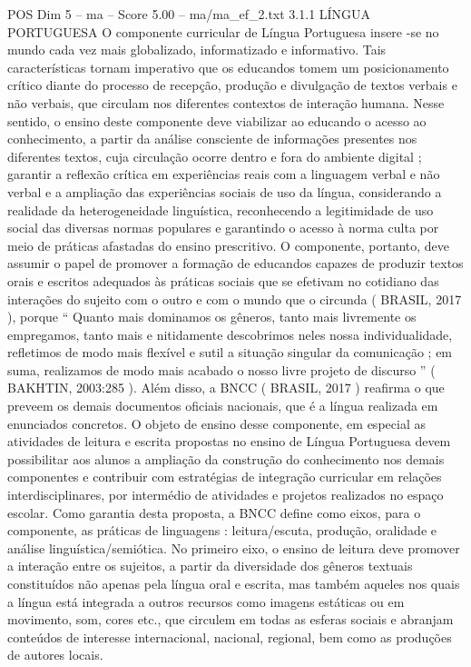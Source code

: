 \begin{textsample}{POS Dim 5 – ma – Score 5.00 – ma/ma\_ef\_2.txt}  \label{ex:f5_pos_173}
3.1.1 LÍNGUA PORTUGUESA O componente curricular de Língua Portuguesa insere -se no mundo cada vez mais globalizado, informatizado e informativo.
Tais características tornam imperativo que os educandos tomem um posicionamento crítico diante do processo de recepção, produção e divulgação de textos verbais e não verbais, que circulam nos diferentes contextos de interação humana.
Nesse sentido, o ensino deste componente deve viabilizar ao educando o acesso ao conhecimento, a partir da análise consciente de informações presentes nos diferentes textos, cuja circulação ocorre dentro e fora do ambiente digital ; garantir a reflexão crítica em experiências reais com a linguagem verbal e não verbal e a ampliação das experiências sociais de uso da língua, considerando a realidade da heterogeneidade linguística, reconhecendo a legitimidade de uso social das diversas normas populares e garantindo o acesso à norma culta por meio de práticas afastadas do ensino prescritivo.
O componente, portanto, deve assumir o papel de promover a formação de educandos capazes de produzir textos orais e escritos adequados às práticas sociais que se efetivam no cotidiano das interações do sujeito com o outro e com o mundo que o circunda ( BRASIL, 2017 ), porque “ Quanto mais dominamos os gêneros, tanto mais livremente os empregamos, tanto mais e nitidamente descobrimos neles nossa individualidade, refletimos de modo mais flexível e sutil a situação singular da comunicação ; em suma, realizamos de modo mais acabado o nosso livre projeto de discurso ” ( BAKHTIN, 2003:285 ).
Além disso, a BNCC ( BRASIL, 2017 ) reafirma o que preveem os demais documentos oficiais nacionais, que é a língua realizada em enunciados concretos.
O objeto de ensino desse componente, em especial as atividades de leitura e escrita propostas no ensino de Língua Portuguesa devem possibilitar aos alunos a ampliação da construção do conhecimento nos demais componentes e contribuir com estratégias de integração curricular em relações interdisciplinares, por intermédio de atividades e projetos realizados no espaço escolar.
Como garantia desta proposta, a BNCC define como eixos, para o componente, as práticas de linguagens : leitura/escuta, produção, oralidade e análise linguística/semiótica.
No primeiro eixo, o ensino de leitura deve promover a interação entre os sujeitos, a partir da diversidade dos gêneros textuais constituídos não apenas pela língua oral e escrita, mas também aqueles nos quais a língua está integrada a outros recursos como imagens estáticas ou em movimento, som, cores etc., que circulem em todas as esferas sociais e abranjam conteúdos de interesse internacional, nacional, regional, bem como as produções de autores locais.

\end{textsample}
